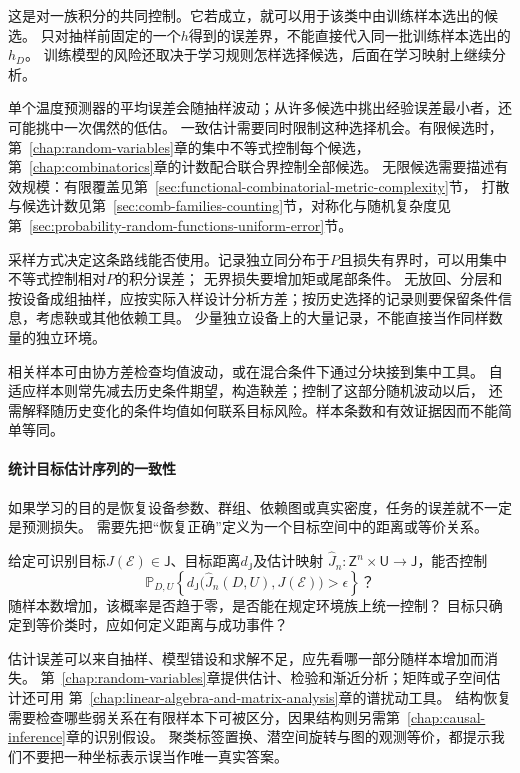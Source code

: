 这是对一族积分的共同控制。它若成立，就可以用于该类中由训练样本选出的候选。
只对抽样前固定的一个$h$得到的误差界，不能直接代入同一批训练样本选出的$h_D$。
训练模型的风险还取决于学习规则怎样选择候选，后面在学习映射上继续分析。

单个温度预测器的平均误差会随抽样波动；从许多候选中挑出经验误差最小者，还可能挑中一次偶然的低估。
一致估计需要同时限制这种选择机会。有限候选时，第~\ref{chap:random-variables}章的集中不等式控制每个候选，
第~\ref{chap:combinatorics}章的计数配合联合界控制全部候选。
无限候选需要描述有效规模：有限覆盖见第~\ref{sec:functional-combinatorial-metric-complexity}节，
打散与候选计数见第~\ref{sec:comb-families-counting}节，对称化与随机复杂度见第~\ref{sec:probability-random-functions-uniform-error}节。

采样方式决定这条路线能否使用。记录独立同分布于$P$且损失有界时，可以用集中不等式控制相对$P$的积分误差；
无界损失要增加矩或尾部条件。
无放回、分层和按设备成组抽样，应按实际入样设计分析方差；按历史选择的记录则要保留条件信息，考虑鞅或其他依赖工具。
少量独立设备上的大量记录，不能直接当作同样数量的独立环境。

相关样本可由协方差检查均值波动，或在混合条件下通过分块接到集中工具。
自适应样本则常先减去历史条件期望，构造鞅差；控制了这部分随机波动以后，
还需解释随历史变化的条件均值如何联系目标风险。样本条数和有效证据因而不能简单等同。

\paragraph{统计目标估计序列的一致性}
\label{sec:future-analysis-statistical-recovery}

如果学习的目的是恢复设备参数、群组、依赖图或真实密度，任务的误差就不一定是预测损失。
需要先把“恢复正确”定义为一个目标空间中的距离或等价关系。

\begin{mathproblem}[估计映射的恢复误差与统计一致性]
  \label{question:future-statistical-recovery}
  给定可识别目标$J(\mathcal E)\in\mathsf J$、目标距离$d_{\mathsf J}$及估计映射
  $\widehat J_n:\mathsf Z^n\times\mathsf U\to\mathsf J$，能否控制
  \[
    \mathbb P_{D,U}\!\left\{
      d_{\mathsf J}\bigl(\widehat J_n(D,U),J(\mathcal E)\bigr)>\epsilon
    \right\}\text{？}
  \]
  随样本数增加，该概率是否趋于零，是否能在规定环境族上统一控制？
  目标只确定到等价类时，应如何定义距离与成功事件？
\end{mathproblem}

估计误差可以来自抽样、模型错设和求解不足，应先看哪一部分随样本增加而消失。
第~\ref{chap:random-variables}章提供估计、检验和渐近分析；矩阵或子空间估计还可用
第~\ref{chap:linear-algebra-and-matrix-analysis}章的谱扰动工具。
结构恢复需要检查哪些弱关系在有限样本下可被区分，因果结构则另需第~\ref{chap:causal-inference}章的识别假设。
聚类标签置换、潜空间旋转与图的观测等价，都提示我们不要把一种坐标表示误当作唯一真实答案。

